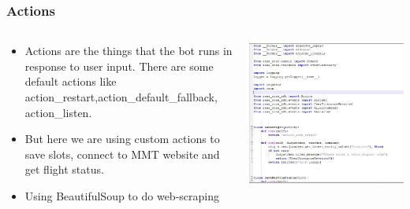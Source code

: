  \begin{frame}[fragile]\frametitle{Actions }
 
    \begin{columns}
    \begin{column}[t]{0.5\linewidth}
\begin{itemize}
\item Actions are the things that the bot runs in response to user input. There are some default actions like action\_restart,action\_default\_fallback, action\_listen. 
\item But here we are using custom actions to save slots, connect to MMT website and get flight status.
\item Using BeautifulSoup to do web-scraping
\end{itemize}
\end{column}
    \begin{column}[t]{0.5\linewidth}
\begin{center}
\includegraphics[width=\linewidth,keepaspectratio]{images/mmt6}
\end{center}
\end{column}
\end{columns}
\end{frame}

